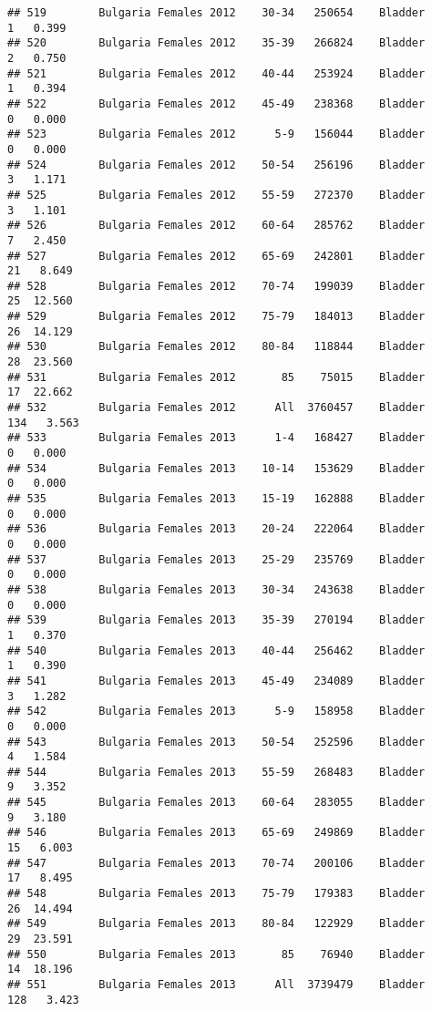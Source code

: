 \documentclass[
]{article}
\begin{document}
\begin{verbatim}
## 519        Bulgaria Females 2012    30-34   250654    Bladder      1   0.399
## 520        Bulgaria Females 2012    35-39   266824    Bladder      2   0.750
## 521        Bulgaria Females 2012    40-44   253924    Bladder      1   0.394
## 522        Bulgaria Females 2012    45-49   238368    Bladder      0   0.000
## 523        Bulgaria Females 2012      5-9   156044    Bladder      0   0.000
## 524        Bulgaria Females 2012    50-54   256196    Bladder      3   1.171
## 525        Bulgaria Females 2012    55-59   272370    Bladder      3   1.101
## 526        Bulgaria Females 2012    60-64   285762    Bladder      7   2.450
## 527        Bulgaria Females 2012    65-69   242801    Bladder     21   8.649
## 528        Bulgaria Females 2012    70-74   199039    Bladder     25  12.560
## 529        Bulgaria Females 2012    75-79   184013    Bladder     26  14.129
## 530        Bulgaria Females 2012    80-84   118844    Bladder     28  23.560
## 531        Bulgaria Females 2012       85    75015    Bladder     17  22.662
## 532        Bulgaria Females 2012      All  3760457    Bladder    134   3.563
## 533        Bulgaria Females 2013      1-4   168427    Bladder      0   0.000
## 534        Bulgaria Females 2013    10-14   153629    Bladder      0   0.000
## 535        Bulgaria Females 2013    15-19   162888    Bladder      0   0.000
## 536        Bulgaria Females 2013    20-24   222064    Bladder      0   0.000
## 537        Bulgaria Females 2013    25-29   235769    Bladder      0   0.000
## 538        Bulgaria Females 2013    30-34   243638    Bladder      0   0.000
## 539        Bulgaria Females 2013    35-39   270194    Bladder      1   0.370
## 540        Bulgaria Females 2013    40-44   256462    Bladder      1   0.390
## 541        Bulgaria Females 2013    45-49   234089    Bladder      3   1.282
## 542        Bulgaria Females 2013      5-9   158958    Bladder      0   0.000
## 543        Bulgaria Females 2013    50-54   252596    Bladder      4   1.584
## 544        Bulgaria Females 2013    55-59   268483    Bladder      9   3.352
## 545        Bulgaria Females 2013    60-64   283055    Bladder      9   3.180
## 546        Bulgaria Females 2013    65-69   249869    Bladder     15   6.003
## 547        Bulgaria Females 2013    70-74   200106    Bladder     17   8.495
## 548        Bulgaria Females 2013    75-79   179383    Bladder     26  14.494
## 549        Bulgaria Females 2013    80-84   122929    Bladder     29  23.591
## 550        Bulgaria Females 2013       85    76940    Bladder     14  18.196
## 551        Bulgaria Females 2013      All  3739479    Bladder    128   3.423

\end{verbatim}
\end{document}
